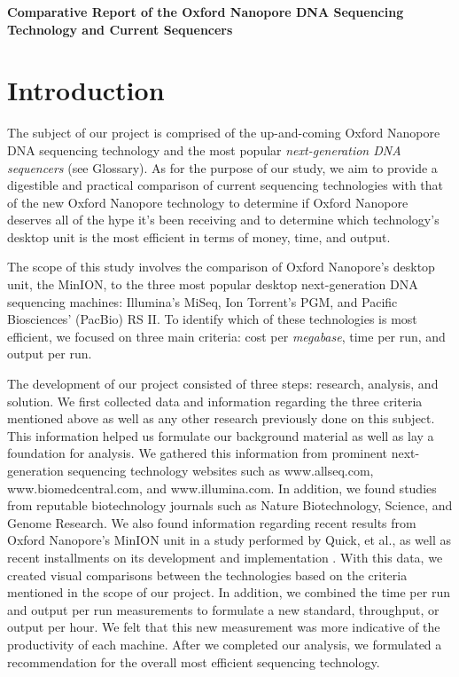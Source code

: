 \documentclass[12pt,letterpaper]{report}
\begin{document}
\begin{center}
\textbf{\Large{Comparative Report of the Oxford Nanopore DNA Sequencing Technology and Current Sequencers}}
\end{center}

\section{Introduction}
The subject of our project is comprised of the up-and-coming Oxford Nanopore DNA sequencing technology and the most popular \textit{next-generation DNA sequencers} (see Glossary). As for the purpose of our study, we aim to provide a digestible and practical comparison of current sequencing technologies with that of the new Oxford Nanopore technology to determine if Oxford Nanopore deserves all of the hype it's been receiving and to determine which technology's desktop unit is the most efficient in terms of money, time, and output.

The scope of this study involves the comparison of Oxford Nanopore's desktop unit, the MinION, to the three most popular desktop next-generation DNA sequencing machines: Illumina's MiSeq, Ion Torrent's PGM, and Pacific Biosciences' (PacBio) RS II. To identify which of these technologies is most efficient, we focused on three main criteria: cost per \textit{megabase}, time per run, and output per run. 

The development of our project consisted of three steps: research, analysis, and solution. We first collected data and information regarding the three criteria mentioned above as well as any other research previously done on this subject. This information helped us formulate our background material as well as lay a foundation for analysis. We gathered this information from prominent next-generation sequencing technology websites such as www.allseq.com, www.biomedcentral.com, and www.illumina.com. In addition, we found studies from reputable biotechnology journals such as Nature Biotechnology, Science, and Genome Research. We also found information regarding recent results from Oxford Nanopore's MinION unit in a study performed by Quick, et al., as well as recent installments on its development and implementation \cite{Quick}. With this data, we created visual comparisons between the technologies based on the criteria mentioned in the scope of our project. In addition, we combined the time per run and output per run measurements to formulate a new standard, throughput, or output per hour. We felt that this new measurement was more indicative of the productivity of each machine. After we completed our analysis, we formulated a recommendation for the overall most efficient sequencing technology.
\end{document}
